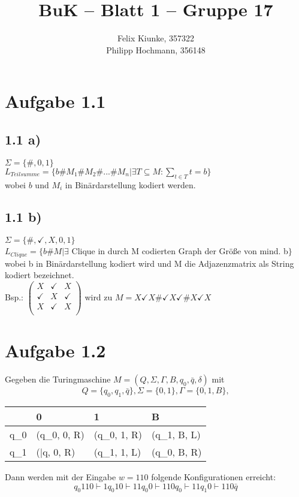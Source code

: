 \documentclass[11pt, oneside]{article}   	%
\title{BuK – Blatt 1 – Gruppe 17}
\author{Felix Kiunke, 357322\\Philipp Hochmann, 356148}
\date{\vspace{-5ex}}
\begin{document}
\maketitle

\section*{Aufgabe 1.1}
\subsection*{1.1 a)}
 
$\Sigma = \{ \#, 0, 1 \}$\\
$L_{Teilsumme} = \{ b\#M_1\#M_2\#...\#M_n | \exists T \subseteq M : \sum_{t \in T} t = b \}$\\
wobei $b$ und $M_i$ in Bin\"ardarstellung kodiert werden.
 
\subsection*{1.1 b)}
$\Sigma = \{ \#, \checkmark, X, 0, 1 \}$\\
$L_{Clique} = \{ b \# M | \exists $ Clique in durch M codierten Graph der Gr\"o\ss{}e von mind. b$ \}$\\
wobei b in Bin\"ardarstellung kodiert wird und M die Adjazenzmatrix als String kodiert bezeichnet.\\
Bsp.:
$
\begin{pmatrix}
X & \checkmark & X \\
\checkmark & X & \checkmark \\
X & \checkmark & X \\
\end{pmatrix}
$ wird zu $M=X \checkmark X \# \checkmark X \checkmark \# X \checkmark X$

\section*{Aufgabe 1.2}
Gegeben die Turingmaschine $M = (Q, \Sigma, \Gamma, B, q_0, \bar{q}, \delta)$ mit
$$
	Q = \{q_0, q_1, \bar{q}\},
	\Sigma = \{0, 1\},
	\Gamma = \{0, 1, B\},
$$
\begin{center}
\begin{tabular}{L|LLL}
	\delta & 0 & 1 & B \\
	\hline
	q_0 & (q_0, 0, R) & (q_0, 1, R) & (q_1, B, L) \\
	q_1 & (\bar{q}, 0, R) & (q_1, 1, L) & (q_0, B, R)
\end{tabular}
\end{center}
Dann werden mit der Eingabe $w = 110$ folgende Konfigurationen erreicht:
$$
q_0 110 \vdash 1 q_0 10 \vdash 11 q_0 0 \vdash 110 q_0 \vdash 11 q_1 0 \vdash 110 \bar{q}
$$
\end{document}
